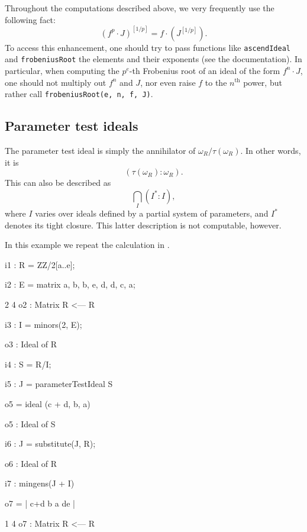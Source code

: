 \documentclass{amsart}
\begin{document}
\begin{remark}
Throughout the computations described above, we very frequently use the following fact:
\[
(f^p \cdot J)^{[1/p]} = f \cdot (J^{[1/p]}).
\]
To access this enhancement, one should try to pass functions like \texttt{ascendIdeal} and \texttt{frobeniusRoot} the elements and their exponents (see the documentation).
In particular, when computing the $p^e$-th Frobenius root of an ideal of the form $f^n \cdot J$, one should not multiply out $f^n$ and $J$, nor even raise $f$ to the $n^\mathrm{th}$ power, but rather call \texttt{frobeniusRoot(e, n, f, J)}.
\end{remark}

\subsection{Parameter test ideals}

The parameter test ideal is simply the annihilator of $\omega_R/\tau(\omega_R)$.  In other words, it is
\[
( \tau(\omega_R) : \omega_R ).
\]
This can also be described as
\[
\bigcap_{I} (I^* : I),
\]
where $I$ varies over ideals defined by a partial system of parameters, and $I^*$ denotes its tight closure.  This latter description is not computable, however.

\begin{example}\label{Example: parameter test ideal}
In this example we repeat the calculation in \cite[\S 9]{KatzmanParameterTestIdealOfCMRings}.

\medskip
{\small{}
\begin{MyVerbatim}
i1 : R = ZZ/2[a..e];

i2 : E = matrix {{a, b, b, e}, {d, d, c, a}};

             2       4
o2 : Matrix R  <--- R

i3 : I = minors(2, E);

o3 : Ideal of R

i4 : S = R/I;

i5 : J = parameterTestIdeal S

o5 = ideal (c + d, b, a)

o5 : Ideal of S

i6 : J = substitute(J, R);

o6 : Ideal of R

i7 : mingens(J + I)

o7 = | c+d b a de |

             1       4
o7 : Matrix R  <--- R
\end{MyVerbatim}
}\medskip

\end{example}
\end{document}
